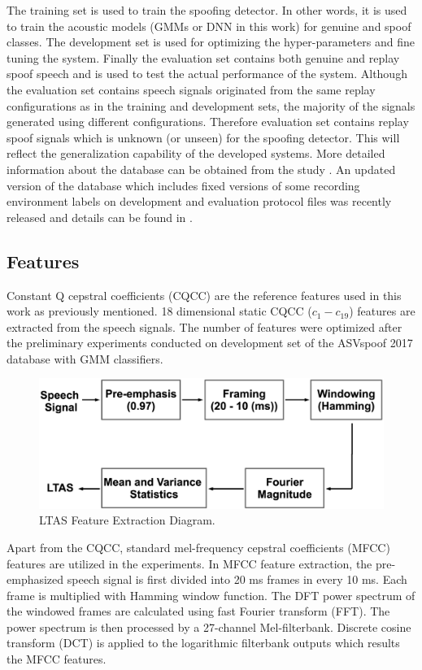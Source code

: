 \documentclass{article}
\begin{document}
The training set is used to train the spoofing detector. In other words, it is used to train the acoustic models (GMMs
or DNN in this work) for genuine and spoof classes. The development set is used for optimizing the hyper-parameters and
fine tuning the system. Finally the evaluation set contains both genuine and replay spoof speech and is used to test
the actual performance of the system. Although the evaluation set contains speech signals originated from the same
replay configurations as in the training and development sets, the majority of the signals generated using different
configurations. Therefore evaluation set contains replay spoof signals which is unknown (or unseen) for the spoofing
detector. This will reflect the generalization capability of the developed systems. More detailed information about the
database can be obtained from the study \cite{kinnunen2017reddots}. An updated version of the database which includes
fixed versions of some recording environment labels on development and evaluation protocol files was recently released
and details can be found in \cite{delgado2018asvspoof}.

\subsection{Features}
\label{features}
Constant Q cepstral coefficients (CQCC) are the reference features used in this work as previously mentioned. 18
dimensional static CQCC ($c_1 - c_{19}$) features are extracted from the speech signals. The number of features were
optimized after the preliminary experiments conducted on development set of the ASVspoof 2017 database with GMM
classifiers.

\begin{figure}[!htb]
    \centering
    \includegraphics[scale=0.124]{./Images/ltas-diagram.eps}
    \caption{LTAS Feature Extraction Diagram.}
    \label{ltas_diagram}
\end{figure}

Apart from the CQCC, standard mel-frequency cepstral coefficients (MFCC) features \cite{davis1980comparison} are
utilized in the experiments. In MFCC feature extraction, the pre-emphasized speech signal is first divided into 20 ms
frames in every 10 ms. Each frame is multiplied with Hamming window function. The DFT power spectrum of the windowed
frames are calculated using fast Fourier transform (FFT). The power spectrum is then processed by a 27-channel
Mel-filterbank. Discrete cosine transform (DCT) is applied to the logarithmic filterbank outputs which results the MFCC
features.
\end{document}
